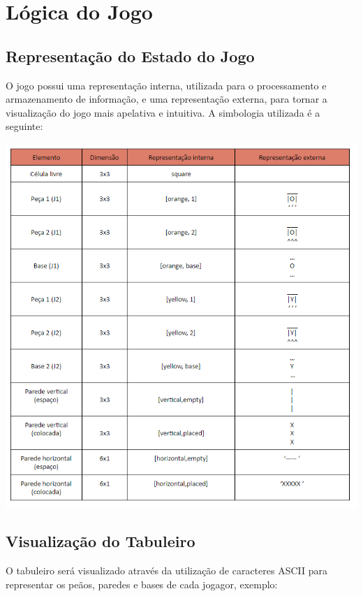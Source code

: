 \documentclass[a4paper]{article}
\begin{document}
\section{Lógica do Jogo}


\subsection{Representação do Estado do Jogo} 

O jogo possui uma representação interna, utilizada para o processamento e armazenamento de informação, e uma representação externa, para tornar a visualização do jogo mais apelativa e intuitiva. A simbologia utilizada é a seguinte: 


\begin{center}
\includegraphics[scale = 0.7]{fig3.png}
\end{center}

\newpage
\subsection{Visualização do Tabuleiro} 
O tabuleiro será visualizado através da utilização de caracteres ASCII para representar os peãos, paredes e bases de cada jogagor, exemplo:
\end{document}
